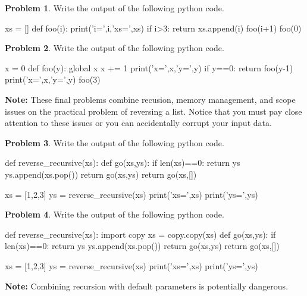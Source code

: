 \documentclass[12pt]{article}
\theoremstyle{definition}
\newtheorem{problem}{Problem}
\begin{document}
\begin{problem}
Write the output of the following python code.
\begin{python}
xs = []
def foo(i):
    print('i=',i,'xs=',xs)
    if i>3:
        return
    xs.append(i)
    foo(i+1)
foo(0)
\end{python}
\end{problem}
\vspace{2in}


\begin{problem}
Write the output of the following python code.
\begin{python}
x = 0
def foo(y):
    global x
    x += 1
    print('x=',x,'y=',y)
    if y==0:
        return
    foo(y-1)
    print('x=',x,'y=',y)
foo(3)
\end{python}
\end{problem}

\newpage
\noindent
\textbf{Note:}
These final problems combine recusion, memory management, and scope issues on the practical problem of reversing a list.
Notice that you must pay close attention to these issues or you can accidentally corrupt your input data.

\begin{problem}
Write the output of the following python code.
\begin{python}
def reverse_recursive(xs):
    def go(xs,ys):
        if len(xs)==0:
            return ys
        ys.append(xs.pop())
        return go(xs,ys)
    return go(xs,[])

xs = [1,2,3]
ys = reverse_recursive(xs)
print('xs=',xs)
print('ys=',ys)
\end{python}
\end{problem}
\vspace{1in}

\begin{problem}
Write the output of the following python code.
\begin{python}
def reverse_recursive(xs):
    import copy
    xs = copy.copy(xs)
    def go(xs,ys):
        if len(xs)==0:
            return ys
        ys.append(xs.pop())
        return go(xs,ys)
    return go(xs,[])

xs = [1,2,3]
ys = reverse_recursive(xs)
print('xs=',xs)
print('ys=',ys)
\end{python}
\end{problem}
\vspace{2in}

\newpage
\noindent
\textbf{Note:}
Combining recursion with default parameters is potentially dangerous.
\end{document}
